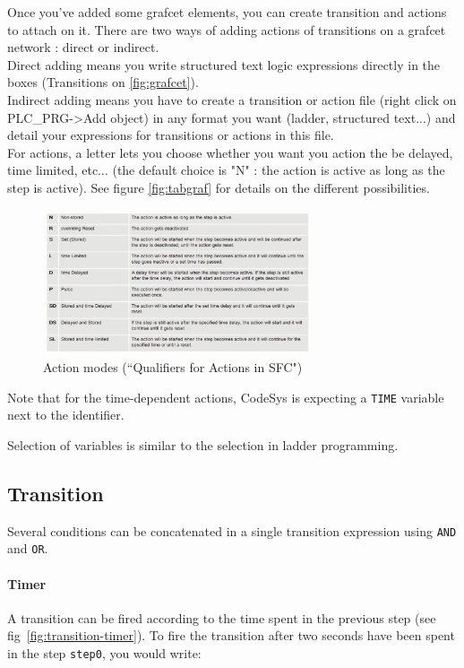 \documentclass[10pt,a4paper]{article}
\begin{document}
Once you've added some grafcet elements, you can create transition and actions to attach on it.
There are two ways of adding actions of transitions on a grafcet network : direct or indirect.\\
Direct adding means you write structured text logic expressions directly in the boxes (Transitions on \vref{fig:grafcet}).\\
Indirect adding means you have to create a transition or action file (right click on PLC\_PRG->Add object) in any format you want (ladder, structured text...) and detail your expressions for transitions or actions in this file.\\
For actions, a letter lets you choose whether you want you action the be delayed, time limited, etc... (the default choice is "N" : the action is active as long as the step is active).
See figure \vref{fig:tabgraf} for details on the different possibilities.

\begin{figure}[h!]
	\begin{center}
		\includegraphics[width=300px]{tableaugrafcet.png}
	\end{center}
\caption{Action modes (``Qualifiers for Actions in SFC")}
\label{fig:tabgraf}
\end{figure}

Note that for the time-dependent actions, CodeSys is expecting a \texttt{TIME} variable next to the identifier.

Selection of variables is similar to the selection in ladder programming.

\subsection{Transition}
Several conditions can be concatenated in a single transition expression using \texttt{AND} and \texttt{OR}.

\paragraph{Timer}
A transition can be fired according to the time spent in the previous step (see fig~\ref{fig:transition-timer}).
To fire the transition after two seconds have been spent in the step \texttt{step0}, you would write:
\end{document}

